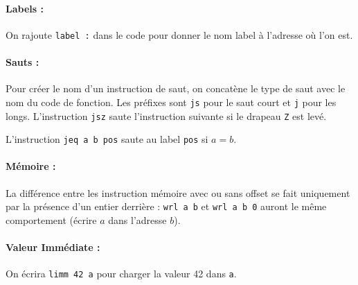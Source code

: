 \documentclass[12pt]{article}
\begin{document}
\paragraph{Labels :} On rajoute \verb!label :! dans le code pour donner le nom \og
label \fg{}  à l'adresse où l'on est.

\paragraph{Sauts :} Pour créer le nom d'un instruction de saut, on concatène le
type de saut avec le nom du code de fonction. Les préfixes sont \verb!js! pour
le saut court et \verb!j! pour les longs. L'instruction \verb!jsz! saute
l'instruction suivante si le drapeau \verb!Z! est levé.

L'instruction \verb!jeq a b pos! saute au label \verb!pos! si $a = b$.

\paragraph{Mémoire :} La différence entre les instruction mémoire avec ou sans
offset se fait uniquement par la présence d'un entier derrière : \verb!wrl a b! et
\verb!wrl a b 0! auront le même comportement (écrire $a$ dans l'adresse $b$).

\paragraph{Valeur Immédiate :} On écrira \verb!limm 42 a! pour charger la valeur
42 dans \verb!a!.
\end{document}
